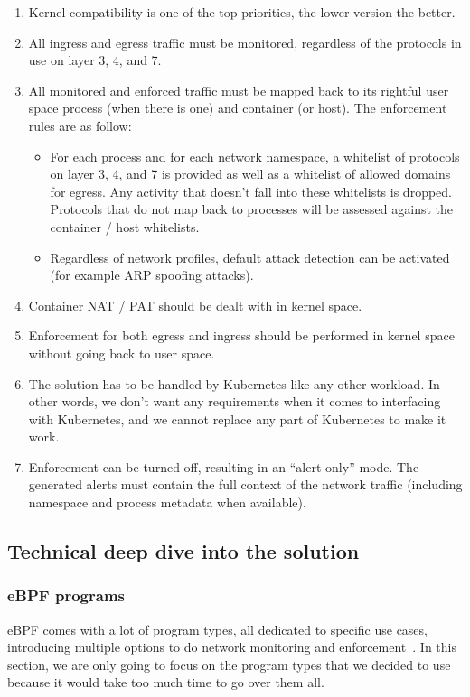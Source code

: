 \begin{enumerate}\itemsep2pt
  \item Kernel compatibility is one of the top priorities, the lower version the better.
  \item All ingress and egress traffic must be monitored, regardless of the protocols in use on layer 3, 4, and 7.
  \item All monitored and enforced traffic must be mapped back to its rightful user space process (when there is one) and container (or host). The enforcement rules are as follow:
  \begin{itemize}
    \item For each process and for each network namespace, a whitelist of protocols on layer 3, 4, and 7 is provided as well as a whitelist of allowed domains for egress. Any activity that doesn’t fall into these whitelists is dropped. Protocols that do not map back to processes will be assessed against the container / host whitelists.
    \item Regardless of network profiles, default attack detection can be activated (for example ARP spoofing attacks).
  \end{itemize}
  \item Container NAT / PAT should be dealt with in kernel space.
  \item Enforcement for both egress and ingress should be performed in kernel space without going back to user space.
  \item The solution has to be handled by Kubernetes like any other workload. In other words, we don't want any requirements when it comes to interfacing with Kubernetes, and we cannot replace any part of Kubernetes to make it work.
  \item Enforcement can be turned off, resulting in an “alert only” mode. The generated alerts must contain the full context of the network traffic (including namespace and process metadata when available).
\end{enumerate}

\subsection{Technical deep dive into the solution}

\subsubsection{eBPF programs}

eBPF comes with a lot of program types, all dedicated to specific use cases, introducing multiple options to do network monitoring and enforcement~\cite{ProcessLevelNetworkSecurityMonitoring:LorenzoFontanaDavidCalavera,ProcessLevelNetworkSecurityMonitoring:GregMarsden}. In this section, we are only going to focus on the program types that we decided to use because it would take too much time to go over them all.

